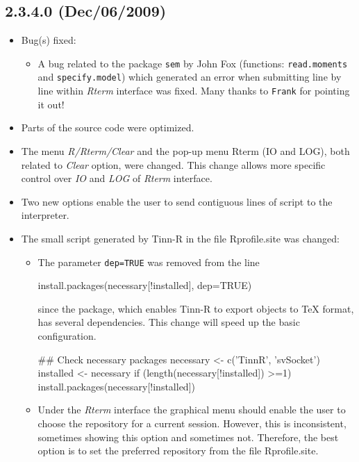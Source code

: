 \subsection*{2.3.4.0 (Dec/06/2009)}
\begin{itemize}
  \item Bug(s) fixed:
    \begin{itemize}
      \item A bug related to the package \texttt{sem} by John Fox
        (functions: \texttt{read.moments} and \texttt{specify.model})
        which generated an error when submitting line by line within
        \textit{Rterm} interface was fixed. Many thanks to \texttt{Frank}
        for pointing it out!
    \end{itemize}
  \item Parts of the source code were optimized.
  \item The menu \textit{R/Rterm/Clear} and the pop-up menu Rterm
    (IO and LOG), both related to \textit{Clear} option, were changed.
    This change allows more specific control over \textit{IO} and
    \textit{LOG} of \textit{Rterm} interface.
  \item Two new options enable the user to send contiguous lines
    of script to the \RR{} interpreter.
  \item The small script generated by Tinn-R in the file Rprofile.site was
    changed:
    \begin{itemize}
      \item The parameter \texttt{dep=TRUE} was removed from the line

        \begin{Scode}
          install.packages(necessary[!installed], dep=TRUE)
        \end{Scode}

        since the  package, which enables Tinn-R to export
        \RR{} objects to TeX format, has several dependencies. This
        change will speed up the basic \RR{} configuration.

        \begin{Scode}
          ## Check necessary packages
          necessary <- c('TinnR', 'svSocket')
          installed <- necessary %
          if (length(necessary[!installed]) >=1)
          install.packages(necessary[!installed])
        \end{Scode}

      \item Under the \textit{Rterm} interface the graphical menu should enable the
        user to choose the repository for a current session. However, this is
        inconsistent, sometimes showing this option and sometimes not. Therefore,
        the best option is to set the preferred repository from the file Rprofile.site.
    \end{itemize}
\end{itemize}


